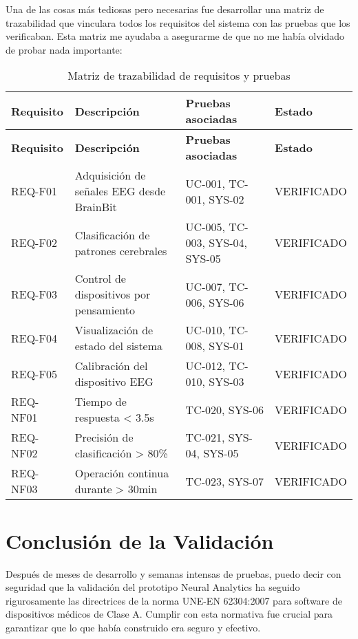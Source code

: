 Una de las cosas más tediosas pero necesarias fue desarrollar una matriz de trazabilidad que vinculara todos los requisitos del sistema con las pruebas que los verificaban. Esta matriz me ayudaba a asegurarme de que no me había olvidado de probar nada importante:


\begin{center}
\small
\begin{longtable}{|p{2.5cm}|p{5.5cm}|p{3.5cm}|p{2.5cm}|}
    \caption{Matriz de trazabilidad de requisitos y pruebas}\label{tab:traceability} \\
    \hline
    \textbf{Requisito} & \textbf{Descripción} & \textbf{Pruebas asociadas} & \textbf{Estado} \\
    \hline
    \endfirsthead
    \hline
    \textbf{Requisito} & \textbf{Descripción} & \textbf{Pruebas asociadas} & \textbf{Estado} \\
    \hline
    \endhead
    REQ-F01 & Adquisición de señales EEG desde BrainBit & UC-001, TC-001, SYS-02 & VERIFICADO \\
    \hline
    REQ-F02 & Clasificación de patrones cerebrales & UC-005, TC-003, SYS-04, SYS-05 & VERIFICADO \\
    \hline
    REQ-F03 & Control de dispositivos por pensamiento & UC-007, TC-006, SYS-06 & VERIFICADO \\
    \hline
    REQ-F04 & Visualización de estado del sistema & UC-010, TC-008, SYS-01 & VERIFICADO \\
    \hline
    REQ-F05 & Calibración del dispositivo EEG & UC-012, TC-010, SYS-03 & VERIFICADO \\
    \hline
    REQ-NF01 & Tiempo de respuesta < 3.5s & TC-020, SYS-06 & VERIFICADO \\
    \hline
    REQ-NF02 & Precisión de clasificación > 80\% & TC-021, SYS-04, SYS-05 & VERIFICADO \\
    \hline
    REQ-NF03 & Operación continua durante > 30min & TC-023, SYS-07 & VERIFICADO \\
    \hline
\end{longtable}
\end{center}

\newpage
\section{Conclusión de la Validación}

Después de meses de desarrollo y semanas intensas de pruebas, puedo decir con seguridad que la validación del prototipo Neural Analytics ha seguido rigurosamente las directrices de la norma UNE-EN 62304:2007 para software de dispositivos médicos de Clase A. Cumplir con esta normativa fue crucial para garantizar que lo que había construido era seguro y efectivo.

